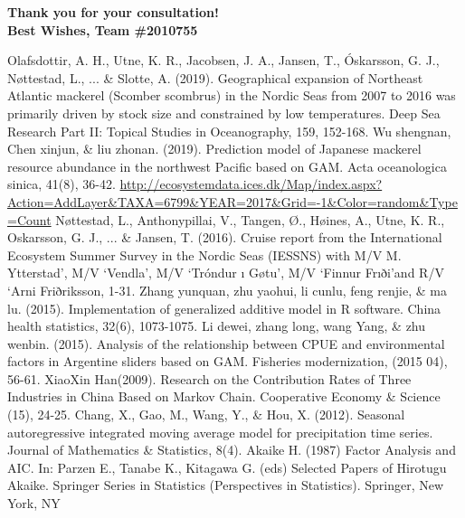 \documentclass{mcmthesis}
\begin{document}
\textbf{Thank you for your consultation!}\\

\textbf{ Best Wishes, Team \#2010755}\\


\begin{thebibliography}{99}
 Olafsdottir, A. H., Utne, K. R., Jacobsen, J. A., Jansen, T., Óskarsson, G. J., Nøttestad, L., ... \& Slotte, A. (2019). Geographical expansion of Northeast Atlantic mackerel (Scomber scombrus) in the Nordic Seas from 2007 to 2016 was primarily driven by stock size and constrained by low temperatures. Deep Sea Research Part II: Topical Studies in Oceanography, 159, 152-168.
  Wu shengnan, Chen xinjun, \& liu zhonan. (2019). Prediction model of Japanese mackerel resource abundance in the northwest Pacific based on GAM. Acta oceanologica sinica, 41(8), 36-42.
\url{http://ecosystemdata.ices.dk/Map/index.aspx?Action=AddLayer&TAXA=6799&YEAR=2017&Grid=-1&Color=random&Type=Count}
 Nøttestad, L., Anthonypillai, V., Tangen, Ø., Høines, A., Utne, K. R., Oskarsson, G. J., ... \& Jansen, T. (2016). Cruise report from the International Ecosystem Summer Survey in the Nordic Seas (IESSNS) with M/V M. Ytterstad’, M/V ‘Vendla’, M/V ‘Tróndur ı Gøtu’, M/V ‘Finnur Frıði’and R/V ‘Arni Friðriksson, 1-31.
 Zhang yunquan, zhu yaohui, li cunlu, feng renjie, \& ma lu. (2015). Implementation of generalized additive model in R software. China health statistics, 32(6), 1073-1075.
Li dewei, zhang long, wang Yang, \& zhu wenbin. (2015). Analysis of the relationship between CPUE and environmental factors in Argentine sliders based on GAM. Fisheries modernization, (2015 04), 56-61.
XiaoXin Han(2009). Research on the Contribution Rates of Three Industries in
China Based on Markov Chain. Cooperative Economy \& Science (15), 24-25.
Chang, X., Gao, M., Wang, Y., \& Hou, X. (2012). Seasonal autoregressive integrated moving average model for precipitation time series. Journal of Mathematics \& Statistics, 8(4).
Akaike H. (1987) Factor Analysis and AIC. In: Parzen E., Tanabe K., Kitagawa G. (eds) Selected Papers of Hirotugu Akaike. Springer Series in Statistics (Perspectives in Statistics). Springer, New York, NY
\end{thebibliography}
\end{document}

